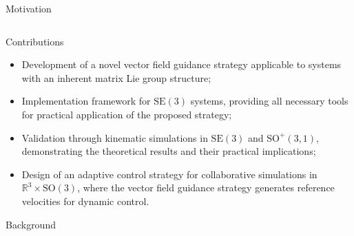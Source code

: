 \begin{frame}{Motivation}
\begin{columns}[c]
\begin{column}{0.4\linewidth}
        \end{column}

    \end{columns}
    
\end{frame}

\begin{frame}{Contributions}
    \begin{itemize}
        \item Development of a novel vector field guidance strategy applicable to systems with an inherent matrix Lie group structure;
        \item Implementation framework for $\text{SE}(3)$ systems, providing all necessary tools for practical application of the proposed strategy;
        \item Validation through kinematic simulations in $\text{SE}(3)$ and $\text{SO}^+(3,1)$, demonstrating the theoretical results and their practical implications;
        \item Design of an adaptive control strategy for collaborative simulations in $\mathbb{R}^3 \times \text{SO}(3)$, where the vector field guidance strategy generates reference velocities for dynamic control.
    \end{itemize}
\end{frame}

\begin{frame}{Background}
\end{frame}

